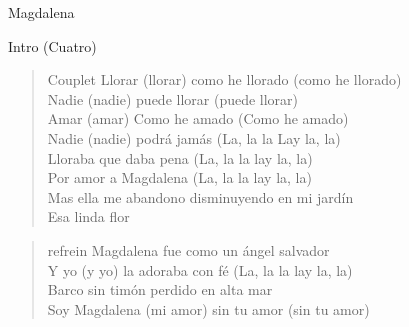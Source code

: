 \begin{song}{Magdalena}

\begin{instrumental}{Intro (Cuatro)}
   
\end{instrumental}


\begin{verse}{Couplet}
	Llorar (llorar) como he llorado (como he llorado)\\
	Nadie (nadie) puede llorar (puede llorar)\\
	Amar (amar) Como he amado (Como he amado)\\
	Nadie (nadie) podrá jamás (La, la la Lay la, la) \\
	Lloraba que daba pena (La, la la lay la, la)\\
	Por amor a Magdalena (La, la la lay la, la)\\
	Mas ella me abandono disminuyendo en mi jardín\\
	Esa linda flor\hspace{4ex}\ 
\end{verse}


\begin{verse}{refrein}
	\hspace{8ex}Magdalena fue como un ángel salvador\\
	Y \chord{A7}yo (y yo) la adoraba con \chord{Dm}fé (La, la la lay la, \chord{D7}la)\\
	\chord{C}Barco sin timón perdido en \chord{F}alta mar\\
	Soy Magdalena (mi amor) sin tu amor (sin tu amor)
\end{verse}

\end{song}
